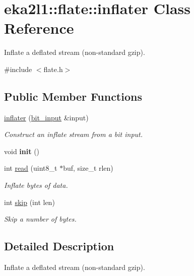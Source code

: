 \hypertarget{classeka2l1_1_1flate_1_1inflater}{}\section{eka2l1\+:\+:flate\+:\+:inflater Class Reference}
\label{classeka2l1_1_1flate_1_1inflater}


Inflate a deflated stream (non-\/standard gzip).  




{\ttfamily \#include $<$flate.\+h$>$}

\subsection*{Public Member Functions}
\begin{DoxyCompactItemize}
\item 
\mbox{\label{classeka2l1_1_1flate_1_1inflater_a913e333473545fb9dfd981144f29ee4f}} 
\mbox{\hyperlink{classeka2l1_1_1flate_1_1inflater_a913e333473545fb9dfd981144f29ee4f}{inflater}} (\mbox{\hyperlink{classeka2l1_1_1flate_1_1bit__input}{bit\+\_\+input}} \&input)
\begin{DoxyCompactList}\small\item\em Construct an inflate stream from a bit input. \end{DoxyCompactList}\item 
\mbox{\label{classeka2l1_1_1flate_1_1inflater_a9c0046659dd21c4d5cd1db2cf5d11550}} 
void {\bfseries init} ()
\item 
int \mbox{\hyperlink{classeka2l1_1_1flate_1_1inflater_a206a1c2025a66e1602f821e9ea45c80f}{read}} (uint8\+\_\+t $\ast$buf, size\+\_\+t rlen)
\begin{DoxyCompactList}\small\item\em Inflate bytes of data. \end{DoxyCompactList}\item 
int \mbox{\hyperlink{classeka2l1_1_1flate_1_1inflater_a552a005904f6bf0c5ca325a28f4fc473}{skip}} (int len)
\begin{DoxyCompactList}\small\item\em Skip a number of bytes. \end{DoxyCompactList}\end{DoxyCompactItemize}


\subsection{Detailed Description}
Inflate a deflated stream (non-\/standard gzip). 

